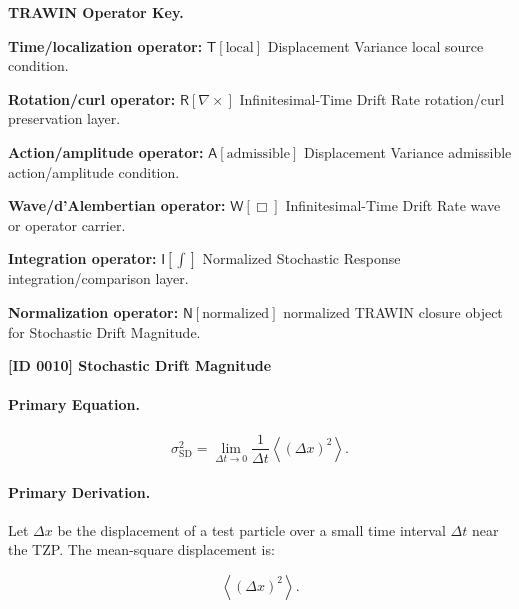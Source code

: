 \par\vspace{0.45\baselineskip}
\noindent\begin{minipage}[t]{\linewidth}
\begingroup
\small
\raggedright
\textbf{TRAWIN Operator Key.}\par
\noindent\textbf{Time/localization operator:} $\mathsf{T}\!\left[\mathrm{local}\right]$ Displacement Variance local source condition.\par
\noindent\textbf{Rotation/curl operator:} $\mathsf{R}\!\left[\nabla\times\right]$ Infinitesimal-Time Drift Rate rotation/curl preservation layer.\par
\noindent\textbf{Action/amplitude operator:} $\mathsf{A}\!\left[\mathrm{admissible}\right]$ Displacement Variance admissible action/amplitude condition.\par
\noindent\textbf{Wave/d'Alembertian operator:} $\mathsf{W}\!\left[\Box\right]$ Infinitesimal-Time Drift Rate wave or operator carrier.\par
\noindent\textbf{Integration operator:} $\mathsf{I}\!\left[\int\right]$ Normalized Stochastic Response integration/comparison layer.\par
\noindent\textbf{Normalization operator:} $\mathsf{N}\!\left[\mathrm{normalized}\right]$ normalized TRAWIN closure object for Stochastic Drift Magnitude.\par
\endgroup
\end{minipage}

\clearpage
\noindent\textbf{[ID 0010] Stochastic Drift Magnitude}\par
\vspace{0.35em}
\paragraph{Primary Equation.}
\begin{equation}
\sigma_{\mathrm{SD}}^{2}
=
\lim_{\Delta t\to 0}
\frac{1}{\Delta t}
\left\langle
(\Delta x)^2
\right\rangle .
\end{equation}

\paragraph{Primary Derivation.}
Let $\Delta x$ be the displacement of a test particle over a small time interval $\Delta t$ near the TZP.  
The mean-square displacement is:

\begin{equation}
\left\langle(\Delta x)^2\right\rangle .
\end{equation}

